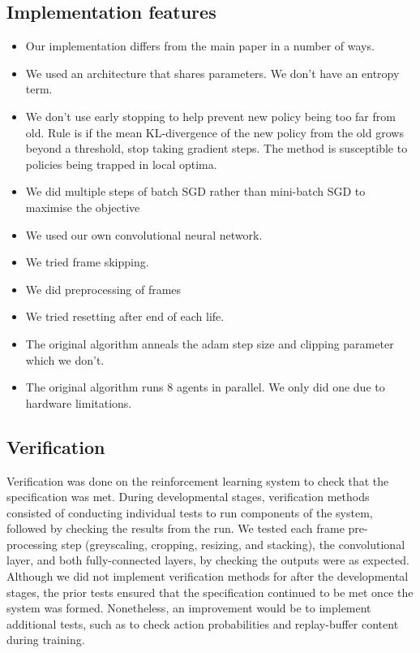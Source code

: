 \documentclass[12pt,a4paper]{article}
\begin{document}
\subsection{Implementation features}
\begin{itemize}
    \item Our implementation differs from the main paper in a number of ways.
    \item We used an architecture that shares parameters. We don't have an entropy term.
    \item We don't use early stopping to help prevent new policy being too far from old. Rule is if the mean KL-divergence of the new policy from the old grows beyond a threshold, stop taking gradient steps. The method is susceptible to policies being trapped in local optima.
    \item We did multiple steps of batch SGD rather than mini-batch SGD to maximise the objective
    \item We used our own convolutional neural network.
    \item We tried frame skipping.
    \item We did preprocessing of frames
    \item We tried resetting after end of each life. 
    \item The original algorithm anneals the adam step size and clipping parameter which we don't.
    \item The original algorithm runs 8 agents in parallel. We only did one due to hardware limitations.
\end{itemize}

\subsection{Verification}
Verification was done on the reinforcement learning system to check that the specification was met. During developmental stages, verification methods consisted of conducting individual tests to run components of the system, followed by checking the results from the run. We tested each frame pre-processing step (greyscaling, cropping, resizing, and stacking), the convolutional layer, and both fully-connected layers, by checking the outputs were as expected. Although we did not implement verification methods for after the developmental stages, the prior tests ensured that the specification continued to be met once the system was formed. Nonetheless, an improvement would be to implement additional tests, such as to check action probabilities and replay-buffer content during training.
\end{document}

